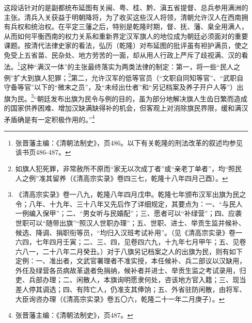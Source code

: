 \documentclass[a4paper, 12pt, openright]{ctexbook}
\begin{document}
这段话针对的是副都统布延图有关闽、粤、桂、黔、滇五省提督、总兵参用满洲的主张。清兵入关获益于明朝降将，为了收买这些汉人将领，清朝允许汉人在西南拥有兵权和统治权。在平定三藩之后，特别是乾隆时期，督、抚、藩、臬全用满人，从而如何平衡西南的权力关系和重新界定汉军旗人的地位成为朝廷必须面对的重要课题。按清代法律史家的看法，弘历（乾隆）对布延图的批评虽有袒护满员，使之免受上五省苗、民杂处、地方劳苦的一面，却从用人行政上严斥了歧视满、汉的看法。\footnote{张晋藩主编：《清朝法制史》，页486。以下有关乾隆的刑法改革的叙述均参见该书页486-487。}这种“满汉一体”的主张最终落实为两类法律的制定：第一，将一些“民人之例”扩大到旗人犯罪；\footnote{如旗人犯死罪，非常赦所不原而“家无以次成丁者”或“亲老丁单者”，均“照民人之例”准其留养（《清高宗实录》卷四三七，乾隆十八年四月己酉）。}第二，允许汉军的低等官员（“文职自同知等官”、“武职自守备等官”以下的“微末之员”，及“未经出仕者”和“另记档案及养子开户人等”）出旗为民。\footnote{《清高宗实录》卷一八九，乾隆八年四月戊申。乾隆七年颁布汉军出旗为民之令；八年、十九年、三十八年又先后作了详细规定，其要点为：一、“与民人一例编入保甲”；二、“男女听与民婚配”；三、愿者可以“补绿营”；四、应袭世职可以“随带出旗”“照汉人世职办理”；五、世职、进士、举贡生监并候补、候选、降调、捐职衔等员，“均归入汉班考试补用”。（见《清高宗实录》卷一六四，七年四月壬寅；二、三、四，见卷四六九，十九年七月甲午；五、见卷六八一，二十八年二月癸丑。）对于八旗另记档案之人的出旗为民，则有如下定例：一、准出者，文武官署理者不准实授，本任候补、兵二部议以汉缺用，外任及绿营各员病故革退者免捐纳，候补者并进士、举贡生监之考试录用，归吏、兵部办理；二、闲散人，本旗询明愿隶何处，咨该地方官入籍；三、现当差人停其调选；四、有阵亡人，仍准支其俸饷；五、外省驻防闲散，由将军、大臣询咨办理（《清高宗实录》卷五〇六，乾隆二十一年二月庚子）。}“朝廷发布出旗为民令与例的目的，虽为部分地解决旗人生齿日繁而造成的国家供养困难、增加汉缺满缺得补的机会，但客观上对消除旗民界限，缓和满汉矛盾确是有一定积极作用的。”\footnote{张晋藩主编：《清朝法制史》，页487。}
\end{document}
